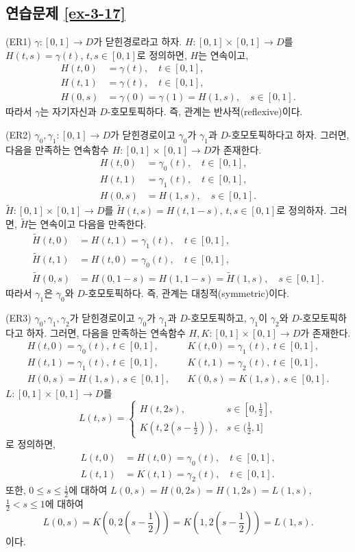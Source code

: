 \subsection*{연습문제 \ref{ex-3-17}}

(ER1)
$\gamma: [0,1] \to D$가 닫힌경로라고 하자.
$H:[0,1]\times[0,1] \to D$를 $H(t,s) = \gamma(t)$, $t,s\in[0,1]$로 정의하면,
$H$는 연속이고,
\begin{align*}
H(t,0) &=\gamma(t), \quad t\in[0,1],\\
H(t,1) &=\gamma(t), \quad t\in[0,1],\\
H(0,s) &=\gamma(0) = \gamma(1) = H(1,s), \quad s\in[0,1].
\end{align*}
따라서 $\gamma$는 자기자신과 $D$-호모토픽하다.
즉, 관계는 반사적(reflexive)이다.

(ER2)
$\gamma_0, \gamma_1: [0,1] \to D$가 닫힌경로이고
$\gamma_0$가 $\gamma_1$과 $D$-호모토픽하다고 하자.
그러면, 다음을 만족하는 연속함수 $H:[0,1]\times[0,1] \to D$가 존재한다.
\begin{align*}
H(t,0) &= \gamma_0(t), \quad t\in [0,1], \\
H(t,1) &= \gamma_1(t), \quad t\in [0,1], \\
H(0,s) &= H(1,s), \quad s\in [0,1].
\end{align*}
$\tilde H:[0,1]\times [0,1] \to D$를
$\tilde H(t,s) = H(t,1-s)$, $t,s\in[0,1]$로 정의하자.
그러면, $\tilde H$는 연속이고 다음을 만족한다.
\begin{align*}
\tilde H(t,0) & = H(t,1) = \gamma_1(t), \quad t\in[0,1], \\
\tilde H(t,1) & = H(t,0) = \gamma_0(t), \quad t\in[0,1], \\
\tilde H(0,s) & = H(0,1-s) = H(1,1-s) = \tilde H(1,s), \quad s\in[0,1].
\end{align*}
따라서 $\gamma_1$은 $\gamma_0$와 $D$-호모토픽하다.
즉, 관계는 대칭적(symmetric)이다.

(ER3)
$\gamma_0, \gamma_1, \gamma_2$가 닫힌경로이고
$\gamma_0$가 $\gamma_1$과 $D$-호모토픽하고,
$\gamma_1$이 $\gamma_2$와 $D$-호모토픽하다고 하자.
그러면, 다음을 만족하는 연속함수  $H, K:[0,1]\times[0,1]\to D$가 존재한다.
\begin{align*}
H(t,0) = \gamma_0(t), \ t\in[0,1], \quad & K(t,0) = \gamma_1(t), \ t\in[0,1], \\
H(t,1) = \gamma_1(t), \ t\in[0,1], \quad & K(t,1) = \gamma_2(t), \ t\in[0,1], \\
H(0,s) = H(1,s), \ s\in[0,1], \quad & K(0,s) = K(1,s), \ s\in[0,1].
\end{align*}
$L:[0,1]\times[0,1]\to D$를
\[
L(t,s) = \begin{cases}
H(t,2s), & s\in [0, \frac12], \\
K\left(t, 2(s-\frac12)\right), & s\in (\frac12,1]
\end{cases}
\]
로 정의하면,
\begin{align*}
L(t,0) &= H(t,0) = \gamma_0(t), \quad t\in[0,1],\\
L(t,1) &= K(t,1) = \gamma_2(t), \quad t\in[0,1].
\end{align*}
또한, $0\le s\le \frac12$에 대하여 $L(0,s) = H(0,2s) = H(1,2s) = L(1,s)$, 
$\frac12 <s\le1$에 대하여
\[
L(0,s) = K\left( 0, 2(s - \frac12) \right) = K\left( 1, 2(s - \frac12) \right) = L(1,s).
\]
이다.

